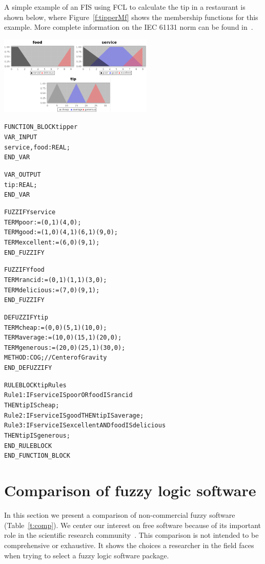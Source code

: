 \documentclass[11pt,twoside]{article}
\begin{document}
\begin{multicols}{2}
A simple example of an FIS using FCL to calculate the tip in a restaurant is shown below, where Figure~\ref{f:tipperMf} shows the membership functions for this example. More complete information on the IEC 61131 norm can be found in~\cite{IEC}.
\vspace*{10pt}
\centerline{\includegraphics[width=2.9in]{./figs/tipper_MF.png}}
\vspace*{2pt}
\label{f:tipperMf}
\vspace*{5pt}
\begin{scriptsize}
\begin{alltt}
FUNCTION\_BLOCK tipper
VAR\_INPUT
	service, food : REAL;
END\_VAR

VAR\_OUTPUT
	tip : REAL;
END\_VAR

FUZZIFY service
	TERM poor := (0, 1) (4, 0) ;
	TERM good := (1, 0) (4,1) (6,1) (9,0);
	TERM excellent := (6, 0) (9, 1);
END\_FUZZIFY

FUZZIFY food
	TERM rancid := (0, 1) (1, 1) (3,0);
	TERM delicious := (7,0) (9,1);
END\_FUZZIFY

DEFUZZIFY tip
	TERM cheap := (0,0) (5,1) (10,0);
	TERM average := (10,0) (15,1) (20,0);
	TERM generous := (20,0) (25,1) (30,0);
	METHOD : COG;			// Center of Gravity
END\_DEFUZZIFY

RULEBLOCK tipRules
	Rule1:	IF service IS poor OR food IS rancid 
       THEN tip IS cheap;
	Rule2:	IF service IS good THEN tip IS average;
	Rule3:	IF service IS excellent AND food IS delicious 
       THEN tip IS generous;
END\_RULEBLOCK
END\_FUNCTION\_BLOCK
\end{alltt}
\end{scriptsize}


\section{Comparison of fuzzy logic software}
\label{sec:stu}

In this section we present a comparison of non-commercial fuzzy software (Table~\ref{t:comp}). We center our interest on free software because of its important role in the scientific research community~\cite{Sonnenburg07}. This comparison is not intended to be comprehensive or exhaustive. It shows the choices a researcher in the field faces when trying to select a fuzzy logic software package.


\end{multicols}
\end{document}
